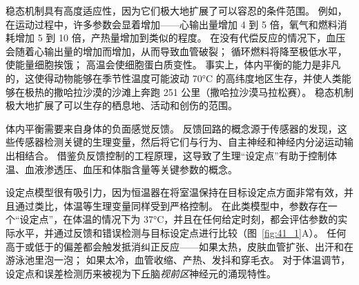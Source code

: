 稳态机制具有高度适应性，因为它们极大地扩展了可以容忍的条件范围。
例如，在运动过程中，许多参数会显着增加——心输出量增加 4 到 5 倍，氧气和燃料消耗增加 5 到 10 倍，产热量增加到类似的程度。
在没有代偿反应的情况下，血压会随着心输出量的增加而增加，从而导致血管破裂；
循环燃料将降至极低水平，使能量细胞挨饿；
高温会使细胞蛋白质变性。
事实上，体内平衡的能力是非凡的，这使得动物能够在季节性温度可能波动 70°C 的高纬度地区生存，并使人类能够在极热的撒哈拉沙漠的沙滩上奔跑 251 公里（撒哈拉沙漠马拉松赛）。
稳态机制极大地扩展了可以生存的栖息地、活动和创伤的范围。


体内平衡需要来自身体的负面感觉反馈。
反馈回路的概念源于传感器的发现，这些传感器检测关键的生理变量，然后将它们与行为、自主神经和神经内分泌运动输出相结合。
借鉴负反馈控制的工程原理，这导致了生理“设定点”有助于控制体温、血液渗透压、血压和体脂含量等关键参数的概念。


设定点模型很有吸引力，因为恒温器在将室温保持在目标设定点方面非常有效，并且通过类比，体温等生理变量同样受到严格控制。
在此类模型中，参数存在一个“设定点”，在体温的情况下为 37°C，并且在任何给定时刻，都会评估参数的实际水平，并通过反馈和错误检测与目标设定点进行比较（图~\ref{fig:41_1}A）。
任何高于或低于的偏差都会触发抵消纠正反应——如果太热，皮肤血管扩张、出汗和在游泳池里泡一泡；
如果太冷，血管收缩、产热、发抖和穿毛衣。
对于体温调节，设定点和误差检测历来被视为下丘脑\textit{视前区}神经元的涌现特性。


